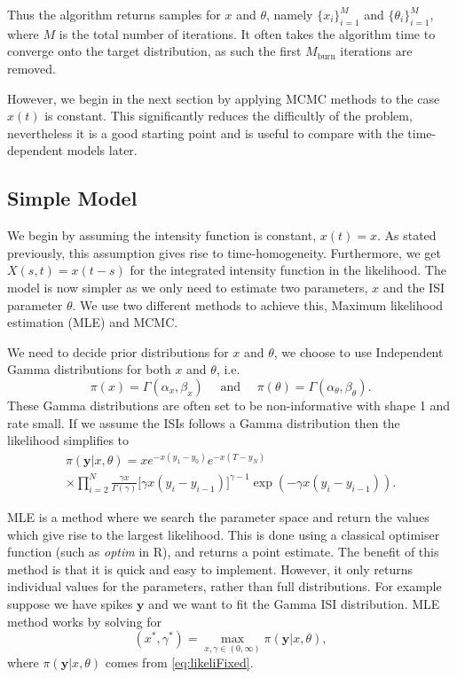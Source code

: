 \documentclass[../main.tex]{subfiles}
\begin{document}
Thus the algorithm returns samples for $x$ and $\theta$, namely $\{x_i \}^M_{i=1}$ and $\{\theta_i \}^M_{i=1}$, where $M$ is the total number of iterations. It often takes the algorithm time to converge onto the target distribution, as such the first $M_{\mathrm{burn}}$ iterations are removed. 

However, we begin in the next section by applying MCMC methods to the case $x(t)$ is constant. This significantly reduces the difficultly of the problem, nevertheless it is a good starting point and is useful to compare with the time-dependent models later.

\subsection{Simple Model}
We begin by assuming the intensity function is constant, $x(t) = x$. As stated previously, this assumption gives rise to time-homogeneity. Furthermore, we get $X(s,t) = x(t-s)$ for the integrated intensity function in the likelihood. The model is now simpler as we only need to estimate two parameters, $x$ and the ISI parameter $\theta$. We use two different methods to achieve this, Maximum likelihood estimation (MLE) and MCMC. 

We need to decide prior distributions for $x$ and $\theta$, we choose to use Independent Gamma distributions for both $x$ and $\theta$, i.e. 
\begin{equation}\label{eq:SimPrior}
\pi(x) = \Gamma(\alpha_x, \beta_x) \quad \text{ and } \quad \pi(\theta) = \Gamma(\alpha_\theta, \beta_\theta).  
\end{equation}
These Gamma distributions are often set to be non-informative with shape 1 and rate small. If we assume the ISIs follows a Gamma distribution then the likelihood simplifies to
\begin{multline}\label{eq:likeliFixed} 
\pi(\mathbf{y} | x,\theta) =  x e^{-x(y_1-y_0)} e^{-x(T-y_N)}  \\
 \times  \prod^N_{i=2}  \frac{\gamma x}{\Gamma ( \gamma )} \big[ \gamma x(y_i - y_{i-1} ) \big]^{\gamma -1} \exp( - \gamma x(y_i - y_{i-1} )  ).
\end{multline}

MLE is a method where we search the parameter space and return the values which give rise to the largest likelihood. This is done using a classical optimiser function (such as {\it optim} in R), and returns a point estimate. The benefit of this method is that it is quick and easy to implement. However, it only returns individual values for the parameters, rather than full distributions. 
For example suppose we have spikes $\mathbf{y}$ and we want to fit the Gamma ISI distribution. MLE method works by solving for
\begin{equation}
(x^*, \gamma^*) =  \max_{x, \gamma \in \left(0, \infty \right)} \pi (\mathbf{y} | x, \theta), 
\end{equation}
where $\pi (\mathbf{y} | x, \theta)$ comes from \eqref{eq:likeliFixed}.
 
\end{document}
